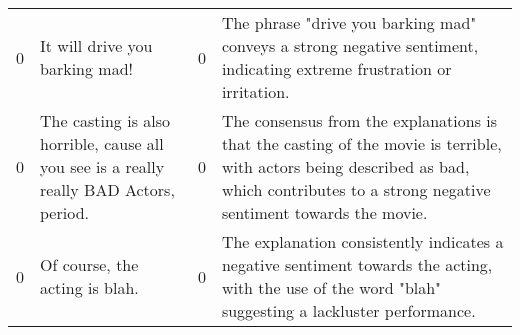 \begin{tabular}{r{1cm} p{0.4in} r{1cm} p{0.4in}}
0 & It will drive you barking mad! & 0 & The phrase "drive you barking mad" conveys a strong negative sentiment, indicating extreme frustration or irritation. \\
0 & The casting is also horrible, cause all you see is a really really BAD Actors, period. & 0 & The consensus from the explanations is that the casting of the movie is terrible, with actors being described as bad, which contributes to a strong negative sentiment towards the movie. \\
0 & Of course, the acting is blah. & 0 & The explanation consistently indicates a negative sentiment towards the acting, with the use of the word "blah" suggesting a lackluster performance. \\
\bottomrule
\end{tabular}
